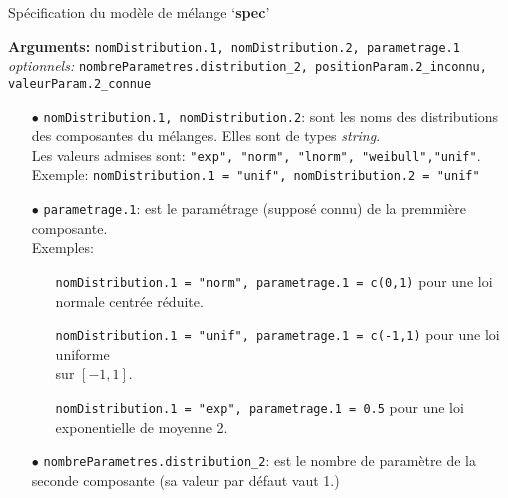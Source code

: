 \documentclass{article}
\makeatletter
\newcommand{\RemoveAlgoNumber}{\renewcommand{\fnum@algocf}{\AlCapSty{\AlCapFnt\algorithmcfname}}}
\newenvironment{fonction}[1][htb]
  {\renewcommand{\algorithmcfname}{Fonction}%
   \begin{algorithm}[#1]%
  }{\end{algorithm}}
\makeatother
\begin{document}
    \RemoveAlgoNumber
    \begin{fonction}
       \caption{Spécification du modèle de mélange \textrm{`\textbf{spec}'} }
            \textbf{Arguments:} \texttt{nomDistribution.1, nomDistribution.2, parametrage.1} \\
            \textit{optionnels:} \texttt{nombreParametres.distribution\_2, positionParam.2\_inconnu, \hspace*{1.55cm} valeurParam.2\_connue}
            \begin{itemize}
                \item[$\bullet$] \texttt{nomDistribution.1, nomDistribution.2}: sont les noms des distributions des composantes du mélanges.
                Elles sont de types \textit{string}. \\ Les valeurs admises sont: \texttt{"exp", "norm", "lnorm", "weibull","unif"}. \\
                \vspace*{0.2cm}
                Exemple: \texttt{nomDistribution.1 = "unif", nomDistribution.2 = "unif"} \\
                \vspace*{0.2cm}
                \item[$\bullet$] \texttt{parametrage.1}: est le paramétrage (supposé connu) de la premmière composante. \\
                \vspace*{0.2cm}
                Exemples:\begin{itemize}
                    \item[] \texttt{nomDistribution.1 = "norm", parametrage.1 = c(0,1)} pour une loi normale centrée réduite.
                    \item[] \texttt{nomDistribution.1 = "unif", parametrage.1 = c(-1,1)} pour une loi uniforme \\ sur $[-1,1]$. 
                    \item[] \texttt{nomDistribution.1 = "exp", parametrage.1 = 0.5} pour une loi exponentielle de moyenne 2.
                        \end{itemize}
                \vspace*{0.2cm}
                \item[$\bullet$] \texttt{nombreParametres.distribution\_2}: est le nombre de paramètre de la seconde composante (sa valeur par défaut vaut 1.) \\

\end{itemize}
\end{fonction}
\end{document}
